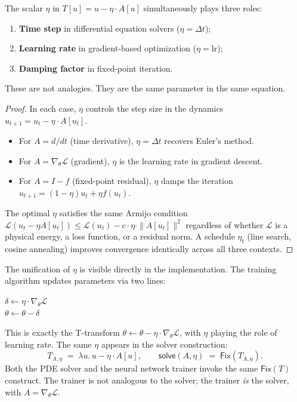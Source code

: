 \documentclass{lmcs}
\theoremstyle{plain}
\theoremstyle{definition}
\newcommand{\Lam}[1]{\lambda #1.\,}
\newcommand{\fix}{\mathsf{Fix}}
\begin{document}
\begin{thm}\label{thm:eta}
The scalar $\eta$ in $T[u] = u - \eta \cdot A[u]$ simultaneously plays three
roles:
\begin{enumerate}
\item \textbf{Time step} in differential equation solvers ($\eta = \Delta t$);
\item \textbf{Learning rate} in gradient-based optimization ($\eta =
  \mathrm{lr}$);
\item \textbf{Damping factor} in fixed-point iteration.
\end{enumerate}
These are not analogies. They are the same parameter in the same equation.
\end{thm}

\begin{proof}
In each case, $\eta$ controls the step size in the dynamics
$u_{t+1} = u_t - \eta \cdot A[u_t]$.
\begin{itemize}
\item For $A = d/dt$ (time derivative), $\eta = \Delta t$ recovers Euler's
  method.
\item For $A = \nabla_\theta \mathcal{L}$ (gradient), $\eta$ is the
  learning rate in gradient descent.
\item For $A = I - f$ (fixed-point residual), $\eta$ damps the iteration
  $u_{t+1} = (1-\eta)u_t + \eta f(u_t)$.
\end{itemize}
The optimal $\eta$ satisfies the same Armijo condition
$\mathcal{L}(u_t - \eta A[u_t]) \leq \mathcal{L}(u_t) - c \cdot \eta \cdot
\|A[u_t]\|^2$ regardless of whether $\mathcal{L}$ is a physical energy, a
loss function, or a residual norm. A schedule $\eta_t$ (line search, cosine
annealing) improves convergence identically across all three contexts.
\end{proof}

The unification of $\eta$ is visible directly in the implementation. The
training algorithm updates parameters via two lines:
\begin{center}
$\delta \leftarrow \eta \cdot \nabla_\theta \mathcal{L}$ \\
$\theta \leftarrow \theta - \delta$
\end{center}
This is exactly the T-transform $\theta \leftarrow \theta - \eta \cdot
\nabla_\theta \mathcal{L}$, with $\eta$ playing the role of learning rate.
The same $\eta$ appears in the solver construction:
\[
T_{A,\eta} \;=\; \Lam{u} u - \eta \cdot A[u],
\qquad
\mathsf{solve}(A, \eta) \;=\; \fix(T_{A,\eta}).
\]
Both the PDE solver and the neural network trainer invoke the same
$\fix(T)$ construct. The trainer is not analogous to the solver; the trainer
\emph{is} the solver, with $A = \nabla_\theta \mathcal{L}$.
\end{document}

